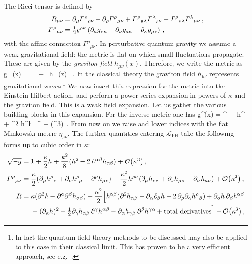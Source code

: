 The Ricci tensor is defined by
%
\begin{align} \begin{aligned}
R_{\mu\nu}& = \partial_{\mu}\Gamma^{\rho}{}_{\rho\nu} - \partial_{\rho}\Gamma^{\rho}{}_{\mu\nu}
+\Gamma^{\rho}{}_{\mu\lambda}\Gamma^{\lambda}{}_{\rho\nu} - \Gamma^{\rho}{}_{\rho\lambda}\Gamma^{\lambda}{}_{\mu\nu} \,, \\
\Gamma^{\rho}{}_{\mu\nu}&= \sfrac{1}{2} g^{\rho\kappa} \left ( \partial_{\mu}g_{\nu\kappa} + \partial_{\nu}g_{\mu\kappa}
-\partial_{\kappa}g_{\mu\nu}
\right ) \, ,
\end{aligned} \end{align}
%
with the affine connection $\Gamma^{\rho}{}_{\mu\nu}$. In perturbative quantum gravity we assume a weak gravitational
field: the metric is flat on which small fluctuations propagate. These are
given by the \emph{graviton field} $h_{\mu\nu}(x)$. Therefore, we write the metric as
%
\be
\label{gravexpand}
g_{\mu\nu}(x) = \eta_{\mu\nu} + \kappa\, h_{\mu\nu}(x) \, .
\ee
%
In the classical theory the graviton field $h_{\mu\nu}$ represents gravitational waves.\footnote{In fact the quantum field theory methods to be discussed may also be applied to this case in their classical limit. This has proven to be a very
efficient approach, see e.g.~\cite{ch1_Goldberger:2004jt,ch1_Bern:2019crd,ch1_Mogull:2020sak}.} We now insert this expression 
for the metric into the
Einstein-Hilbert action, and perform a power series expansion in powers of $\kappa$ and the graviton field.
This is a weak field expansion. Let us gather the various building blocks in this expansion.
For the inverse metric one has
%
\be
g^{\mu\nu}(x) = \eta^{\mu\nu} - \kappa \, h^{\mu\nu} + \kappa^{2} h^{\mu\alpha}h_{\alpha}{}^{\nu} + \cO\bigl(\kappa^{3}\bigr)\, .
\ee
%
From now on we raise and lower indices with the flat Minkowski metric $\eta_{\mu\nu}$. The further quantities entering
$\mathcal{L}_{\text{EH}}$ take the following forms up to cubic order in $\kappa$:
%
\begin{align}
\begin{aligned}
\sqrt{-g} = \ & 1 + \frac{\kappa}{2} h + \frac{\kappa^{2}}{8} (h^{2}-2 \, h^{\alpha\beta}h_{\alpha\beta}) + \cO\bigl(\kappa^{3}\bigr) \,, \\
\Gamma^{\rho}{}_{\mu\nu} = \ & \frac{\kappa}{2} ( \partial_{\mu}h^{\rho}{}_{\nu}+\partial_{\nu}h^{\rho}{}_{\mu}- \partial^{\rho}h_{\mu\nu}) -\frac{\kappa^{2}}{2} h^{\rho\sigma}( \partial_{\mu}h_{\nu\sigma}+ \partial_{\nu}h_{\mu\sigma}
-\partial_{\sigma}h_{\mu\nu}) + \cO\bigl(\kappa^{3}\bigr) \,, \\
R  = \ & \kappa (\partial^{2}h - \partial^{\alpha}\partial^{\beta}h_{\alpha\beta}) - \frac{\kappa^{2}}{2} \Bigl [
h^{\alpha\beta} ( \partial^{2}h_{\alpha\beta}+ \partial_{\alpha}\partial_{\beta}h - 2 \, \partial_{\rho}\partial_{\alpha}
h^{\rho}{}_{\beta}) + \partial_{\alpha}h \, \partial_{\beta}h^{\alpha\beta} \\
& - (\partial_{\alpha}h)^{2} + \sfrac{1}{2}
\partial_{\gamma}h_{\alpha\beta} \, \partial^{\gamma}h^{\a\b}- \partial_{\a}h_{\gamma\b} \,
\partial^{\b}h^{\gamma\a} + \text{total derivatives} \Bigr ] +\cO\bigl(\kappa^{3}\bigr)  \,,
\end{aligned}
\end{align}
